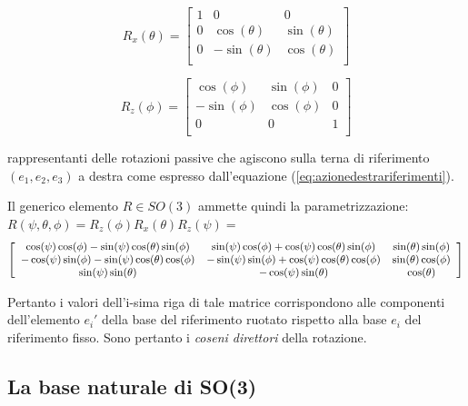 \documentclass[11pt]{report}
\theoremstyle{plain}
\theoremstyle{definition}
\theoremstyle{remark}
\begin{document}
\begin{displaymath}
R_{x}(\theta) = \left[ \begin{array}{ccc}
1 & 0 &0 \\
0 & \cos(\theta) & \sin(\theta)  \\
0 & -\sin(\theta) & \cos(\theta)   \\
\end{array} \right]
\end{displaymath}	

\begin{displaymath}
R_{z}(\phi) = \left[ \begin{array}{ccc}
\cos(\phi) & \sin(\phi) & 0  \\
-\sin(\phi) & \cos(\phi) & 0  \\
0 & 0 & 1 \\
\end{array} \right]
\end{displaymath}	

rappresentanti delle rotazioni passive che agiscono sulla terna di riferimento $(e_ {1 }, e_{2}, e_{3})$ a destra come espresso dall'equazione (\ref{eq:azionedestrariferimenti}).

Il generico elemento  $R \in SO(3)$ ammette quindi la parametrizzazione: $R(\psi , \theta , \phi) = R_{z}(\phi)R_{x}(\theta)R_{z}(\psi) = $
\begin{equation}\label{eq:genericoReulero}\small
\left[ \begin{array}{ccc}
\cos(\psi)\cos(\phi) -\sin(\psi)\cos(\theta)\sin(\phi) & \sin(\psi)\cos(\phi) + \cos(\psi)\cos(\theta)\sin(\phi) & \sin(\theta)\sin(\phi)  \\
-\cos(\psi)\sin(\phi) -\sin(\psi)\cos(\theta)\cos(\phi) & -\sin(\psi)\sin(\phi) + \cos(\psi)\cos(\theta)\cos(\phi) & \sin(\theta)\cos(\phi)  \\
\sin(\psi)\sin(\theta) & -\cos(\psi)\sin(\theta) & \cos(\theta) \\
\end{array} \right]
\end{equation}	

Pertanto i valori dell'i-sima riga di tale matrice corrispondono alle componenti dell'elemento $e_{i}'$ della base del riferimento ruotato rispetto alla base $e_{i}$ del riferimento fisso. Sono pertanto i \emph{coseni direttori} della rotazione.

\subsection{La base naturale di SO(3)}
\end{document}
